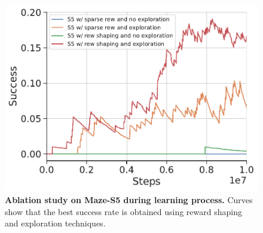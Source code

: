 \begin{figure}
    \centering
    \includegraphics[width=0.8\linewidth]{figures/understanding_vsn/S5_ablation_success}
    \caption{\textbf{Ablation study on Maze-S5 during learning process.} Curves show that the best success rate is obtained using reward shaping and exploration techniques.}
    \label{fig:ablation-maze-success}
\end{figure}

\begin{table}
    \centering
    \caption{\textbf{Evaluation performance for the best models on 100 test mazes.} We compare the evaluation between using $\epsilon\text{-}greedy$ with $\epsilon=0.2$ and using an \textit{stochastic} output, \ie, sampling actions from the last layer of the agent. In both mazes the best result is obtained with $\epsilon\text{-}greedy$.}
    \label{tab:results-maze}
\end{table}

